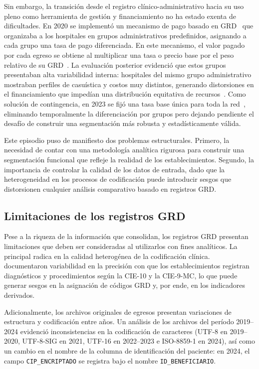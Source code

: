 Sin embargo, la transición desde el registro clínico-administrativo hacia su uso
pleno como herramienta de gestión y financiamiento no ha estado exenta de
dificultades. En 2020 se implementó un mecanismo de pago basado en GRD~\citep{FONASA2024} que
organizaba a los hospitales en grupos administrativos predefinidos, asignando
a cada grupo una tasa de pago diferenciada. En este mecanismo, el valor pagado
por cada egreso se obtiene al multiplicar una tasa o precio base por el peso
relativo de su GRD~\citep{MINSAL2025}. La evaluación posterior evidenció
que estos grupos presentaban alta variabilidad interna: hospitales del mismo
grupo administrativo mostraban perfiles de casuística y costos muy distintos,
generando distorsiones en el financiamiento que impedían una distribución
equitativa de recursos~\citep{Cid2024}.
Como solución de contingencia, en 2023 se fijó una tasa base única para toda
la red~\citep{FONASA2024}, eliminando temporalmente la diferenciación por grupos pero dejando
pendiente el desafío de construir una segmentación más robusta y
estadísticamente válida.

Este episodio puso de manifiesto dos problemas estructurales. Primero, la
necesidad de contar con una metodología analítica rigurosa para construir una
segmentación funcional que refleje la realidad de los establecimientos.
Segundo, la importancia de controlar la calidad de los datos de entrada, dado
que la heterogeneidad en los procesos de codificación puede introducir sesgos
que distorsionen cualquier análisis comparativo basado en registros GRD.

\subsection{Limitaciones de los registros GRD}
\label{sec:grd-limitaciones}

Pese a la riqueza de la información que consolidan, los registros GRD presentan
limitaciones que deben ser consideradas al utilizarlos con fines analíticos.
La principal radica en la calidad heterogénea de la codificación clínica. \citet{Aguila2019} documentaron variabilidad en la precisión con que los
establecimientos registran diagnósticos y procedimientos según la CIE-10 y la
CIE-9-MC, lo que puede generar sesgos en la asignación de códigos GRD y, por
ende, en los indicadores derivados.

Adicionalmente, los archivos originales de egresos presentan variaciones de
estructura y codificación entre años. Un análisis de los archivos del período
2019--2024 evidenció inconsistencias en la codificación de caracteres (UTF-8 en
2019--2020, UTF-8-SIG en 2021, UTF-16 en 2022--2023 e ISO-8859-1 en 2024), así
como un cambio en el nombre de la columna de identificación del paciente: en
2024, el campo \texttt{CIP\_ENCRIPTADO} se registra bajo el nombre
\texttt{ID\_BENEFICIARIO}.

